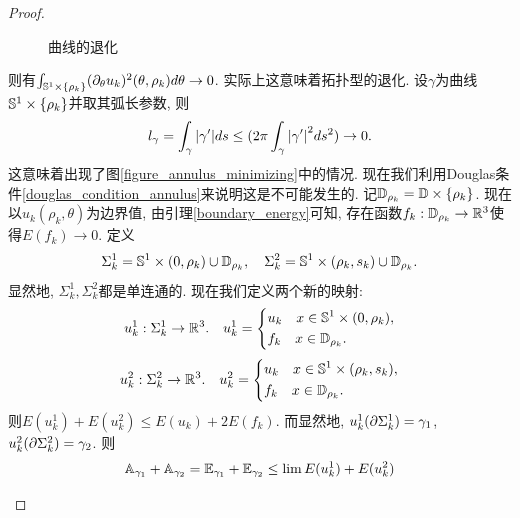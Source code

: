 \begin{proof}
\begin{claim}
\begin{subproof}
\begin{figure}[!h]
                \caption{曲线的退化}
                \label{closed_degenerate}
            \end{figure}
            则有$\int_{\S^1\times \{\rho_k\}} (\PTT{u_k})^2(\theta,\rho_k) d\theta  \to 0$. 实际上这意味着拓扑型的退化. 设$\gamma$为曲线$\S^1 \times \{\rho_k\}$并取其弧长参数, 则
            \begin{equation}
                l_\gamma = \int_\gamma\abs{\gamma'}ds \le (2\pi\int_\gamma \abs{\gamma'}^2ds^2) \to 0.
            \end{equation}
            这意味着出现了图\eqref{figure_annulus_minimizing}中的情况.  现在我们利用Douglas条件\eqref{douglas_condition_annulus}来说明这是不可能发生的.
            记$\D_{\rho_k}=\D \times \{\rho_k\}$. 现在以$u_k(\rho_k,\theta)$为边界值, 由引理\eqref{boundary_energy}可知, 存在函数$f_k: \D_{\rho_k} \to \R^3$使得$E(f_k) \to 0$.  定义
            \begin{equation}
                \Sigma^1_k= \S^1 \times (0,\rho_k) \cup \D_{\rho_k},\s \Sigma^2_k=\S^1\times (\rho_k,s_k) \cup \D_{\rho_k}.
            \end{equation}
            显然地, $\Sigma^1_k, \Sigma^2_k$都是单连通的. 现在我们定义两个新的映射:
            \begin{equation}
                {u}_k^1: \Sigma^1_k \to \R^3.  \s  {u}_k^1=\left\{
                    \begin{aligned}
                        &u_k\s x \in \S^1 \times (0,\rho_k),\\
                        &f_k\s x \in \D_{\rho_k}.
                    \end{aligned}
                \right.
            \end{equation}
            \begin{equation}
                {u}_k^2: \Sigma^2_k \to \R^3.  \s  {u}_k^2=\left\{
                    \begin{aligned}
                        &u_k\s x \in \S^1 \times (\rho_k, s_k),\\
                        &f_k\s x \in \D_{\rho_k}.
                    \end{aligned}
                \right.
            \end{equation}
            则$E({u}_k^1)+E({u}_k^2) \le E(u_k)+2E(f_k)$. 而显然地, ${u}_k^1(\P \Sigma^1_k) = \gamma_1$,${{u}}_k^2(\P \Sigma^2_k)= \gamma_2$. 则
            \begin{equation}
                \begin{split}
                    \AA_{\gamma_1}+\AA_{\gamma_2} = \EE_{\gamma_1}+\EE_{\gamma_2} & \le  \lim E({u}_k^1)+E({u}_k^2)  \\

\end{split}
\end{equation}
\end{subproof}
\end{claim}
\end{proof}
